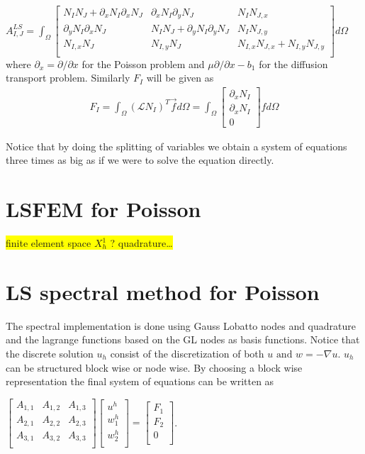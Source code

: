 $
A^{LS}_{I,J} = \int_{\Omega}
\begin{bmatrix}
	N_IN_J + \partial_x N_{I} \partial_xN_{J} & \partial_x N_{I}\partial_y N_{J} & N_IN_{J,x} \\ 	
	\partial_yN_{I}\partial_xN_{J} &N_IN_J + \partial_yN_{I}\partial_yN_{J} &  N_IN_{J,y} \\ 	
	N_{I,x}N_J & N_{I,y}N_J & N_{I,x}N_{J,x} + N_{I,y}N_{J,y} \\ 	
	\label{mat:basicPoisson}
\end{bmatrix}
d\Omega
$
where $\partial_x = \partial / \partial x $ for the Poisson problem and $\mu \partial / \partial x - b_1$ for the diffusion transport problem. Similarly $F_I$ will be given as 
\begin{align}
	F_I = \int_{\Omega}(\mathcal{L}N_I)^T\vec{f} d\Omega = 
	\int_{\Omega}
\begin{bmatrix}
	\partial_xN_I \\
	\partial_xN_I \\
	0
\end{bmatrix}
	f d\Omega
	\label{eq:rhsFunctional}
\end{align}

Notice that by doing the splitting of variables we obtain a system of equations three times as big as if we were to solve the equation directly. 

\section{LSFEM for Poisson}
\colorbox{yellow}{finite element space $X_h^1$ ? quadrature\ldots  }
\section{LS spectral method for Poisson}

The spectral implementation is done using Gauss Lobatto nodes and quadrature and the lagrange functions based on the GL nodes as basis functions. 
Notice that the discrete solution $u_h$ consist of the discretization of both $u \text{ and } w = - \nabla u$. $u_h$ can be structured block wise or node wise. By choosing a block wise representation the final system of equations can be written as 

$
\begin{bmatrix}
	A_{1,1} & A_{1,2} &	A_{1,3} \\ 	
	A_{2,1} & A_{2,2} & A_{2,3} \\ 	
	A_{3,1} & A_{3,2} & A_{3,3} \\ 	
\end{bmatrix}
\begin{bmatrix}
 u^h \\ 	
 w^h_1\\ 	
 w^h_2\\ 	
\end{bmatrix}
=
\begin{bmatrix}
 F_1 \\ 	
 F_2\\ 	
 0 \\ 	
\end{bmatrix}
$.

